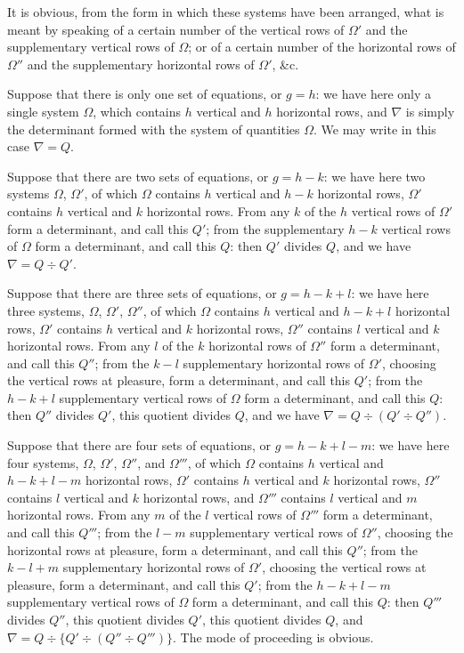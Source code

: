 \documentclass[11pt]{article}
\begin{document}
\medskip
It is obvious, from the form in which these systems have been arranged, what is
meant by speaking of a certain number of the vertical rows of $\Omega'$ and the supplementary
vertical rows of $\Omega$; or of a certain number of the horizontal rows of $\Omega''$ and the
supplementary horizontal rows of $\Omega'$, \&c.

\medskip
Suppose that there is only one set of equations, or $g = h$: we have here only a
single system $\Omega$, which contains $h$ vertical and $h$ horizontal rows, and $\nabla$ is simply the
determinant formed with the system of quantities $\Omega$. We may write in this case $\nabla = Q$.

\medskip
Suppose that there are two sets of equations, or $g = h - k$: we have here two
systems $\Omega$, $\Omega'$, of which $\Omega$ contains $h$ vertical and $h-k$ horizontal rows, $\Omega'$ contains $h$
vertical and $k$ horizontal rows. From any $k$ of the $h$ vertical rows of $\Omega'$ form a
determinant, and call this $Q'$; from the supplementary $h-k$ vertical rows of $\Omega$ form
a determinant, and call this $Q$: then $Q'$ divides $Q$, and we have $\nabla = Q \div Q'$.

\bigskip

Suppose that there are three sets of equations, or $g = h-k+l$: we have here three
systems, $\Omega$, $\Omega'$, $\Omega''$, of which $\Omega$ contains $h$ vertical and $h-k+l$ horizontal rows, $\Omega'$
contains $h$ vertical and $k$ horizontal rows, $\Omega''$ contains $l$ vertical and $k$ horizontal rows.
From any $l$ of the $k$ horizontal rows of $\Omega''$ form a determinant, and call this $Q''$; from
the $k-l$ supplementary horizontal rows of $\Omega'$, choosing the vertical rows at pleasure,
form a determinant, and call this $Q'$; from the $h-k+l$ supplementary vertical rows
of $\Omega$ form a determinant, and call this $Q$: then $Q''$ divides $Q'$, this quotient divides
$Q$, and we have $\nabla = Q \div (Q' \div Q'')$.

\medskip
Suppose that there are four sets of equations, or $g = h-k+l-m$: we have here four
systems, $\Omega$, $\Omega'$, $\Omega''$, and $\Omega'''$, of which $\Omega$ contains $h$ vertical and $h-k+l-m$ horizontal
rows, $\Omega'$ contains $h$ vertical and $k$ horizontal rows, $\Omega''$ contains $l$ vertical and $k$ horizontal
rows, and $\Omega'''$ contains $l$ vertical and $m$ horizontal rows. From any $m$ of the $l$ vertical
rows of $\Omega'''$ form a determinant, and call this $Q'''$; from the $l-m$ supplementary
vertical rows of $\Omega''$, choosing the horizontal rows at pleasure, form a determinant, and
call this $Q''$; from the $k-l+m$ supplementary horizontal rows of $\Omega'$, choosing the
vertical rows at pleasure, form a determinant, and call this $Q'$; from the $h-k+l-m$
supplementary vertical rows of $\Omega$ form a determinant, and call this $Q$: then $Q'''$
divides $Q''$, this quotient divides $Q'$, this quotient divides $Q$, and
$\nabla = Q \div \{Q' \div (Q'' \div Q''')\}$. The mode of proceeding is obvious.
\end{document}
